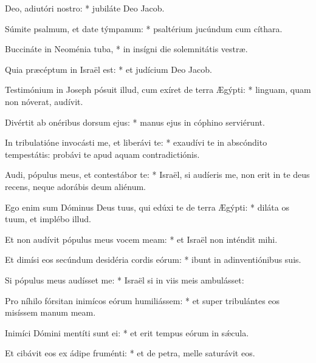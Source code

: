 \begin{psalmus}

 Deo, adiutóri nostro: * jubiláte Deo Jacob.

Súmite psalmum, et date týmpanum: * psaltérium jucúndum cum cíthara.

Buccináte in Neoménia tuba, * in insígni die solemnitátis vestræ.

Quia præcéptum in Israël est: * et judícium Deo Jacob.

Testimónium in Joseph pósuit illud, cum exíret de terra Ægýpti: * linguam, quam non nóverat, audívit.

Divértit ab onéribus dorsum ejus: * manus ejus in cóphino serviérunt.

In tribulatióne invocásti me, et liberávi te: * exaudívi te in abscóndito tempestátis: probávi te apud aquam contradictiónis.

Audi, pópulus meus, et contestábor te: * Israël, si audíeris me, non erit in te deus recens, neque adorábis deum aliénum.

Ego enim sum Dóminus Deus tuus, qui edúxi te de terra Ægýpti: * diláta os tuum, et implébo illud.

Et non audívit pópulus meus vocem meam: * et Israël non inténdit mihi.

Et dimísi eos secúndum desidéria cordis eórum: * ibunt in adinventiónibus suis.

Si pópulus meus audísset me: * Israël si in viis meis ambulásset:

Pro níhilo fórsitan inimícos eórum humiliássem: * et super tribulántes eos misíssem manum meam.

Inimíci Dómini mentíti sunt ei: * et erit tempus eórum in sǽcula.

Et cibávit eos ex ádipe fruménti: * et de petra, melle saturávit eos.

\end{psalmus}
